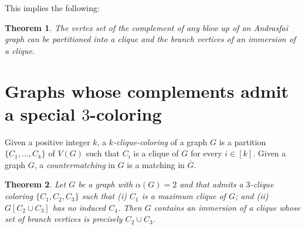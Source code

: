 \documentclass[a4paper,12pt]{article}
\newtheorem{theorem}{Theorem}[section]
\begin{document}
This implies the following: 

\begin{theorem}
 The vertex set of the complement of any blow up of an Andrasfai graph can be partitioned 
 into a clique and the branch vertices of an immersion of a clique. 
\end{theorem}


\section{Graphs whose complements admit a special \(3\)-coloring}

\newcommand{\Gcompl}{\overline{G}}

Given a positive integer \(k\),
a \emph{\(k\)-clique-coloring} of a graph \(G\) is a partition \(\{C_1,\ldots, C_k\}\) of \(V(G)\)
such that \(C_i\) is a clique of \(G\) for every \(i\in[k]\).
Given a graph \(G\), a \emph{countermatching} in \(G\) is a matching in \(\Gcompl\).

\begin{theorem}
	Let \(G\) be a graph with \(\alpha(G) = 2\)
	and that admits a \(3\)-clique coloring \(\{C_1,C_2,C_3\}\) such that
	(i) \(C_1\) is a maximum clique of \(G\); and
	(ii) \(G[C_2\cup C_3]\) has no induced \(C_4\).
	Then \(G\) contains an immersion of a clique whose set of branch vertices is precisely \(C_2\cup C_3\).
\end{theorem}
\end{document}
